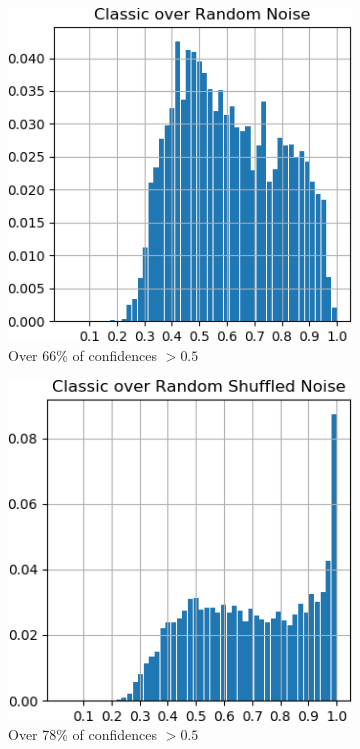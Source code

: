 \documentclass[12pt,oneside]{CUNY_PhD}
\begin{document}
\begin{figure}[!h]
    \centering
    \begin{subfigure}[t]{0.48\textwidth}
        \includegraphics[width=\textwidth]{images/mnist-behavior/classic-hist-random.png}
        \caption*{Over 66\% of confidences $>0.5$}
    \end{subfigure}
    \begin{subfigure}[t]{0.48\textwidth}
        \includegraphics[width=\textwidth]{images/mnist-behavior/classic-hist-shuffled.png}
        \caption*{Over 78\% of confidences $>0.5$}
    \end{subfigure}
    \caption{}
    \label{fig:classic-hists}
\end{figure}
\end{document}
